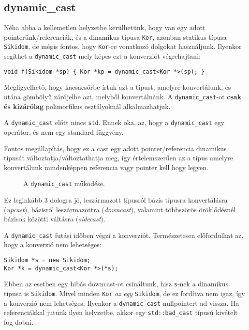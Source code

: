 \documentclass[../cpp_book/cpp_book.tex]{subfiles}
\begin{document}
	\subsection{dynamic\_cast}
	Néha abba a kellemetlen helyzetbe kerülhetünk, hogy van egy adott pointerünk/referenciák, és a dinamikus típusa \texttt{Kor}, azonban statikus típusa \texttt{Sikidom}, de mégis fontos, hogy \texttt{Kor}-re vonatkozó dolgokat használjunk. Ilyenkor segíthet a \texttt{dynamic\_cast} mely képes ezt a konverziót végrehajtani:
	\begin{lstlisting}
void f(Sikidom *sp) { Kor *kp = dynamic_cast<Kor *>(sp); }
	\end{lstlisting}
	Megfigyelhető, hogy kacsacsőrbe írtuk azt a típust, amelyre konvertálunk, és utána gömbölyű zárójelbe azt, melyből konvertálnánk. A \texttt{dynamic\_cast}-ot \textbf{csak és kizárólag} polimorfikus osztályoknál alkalmazhatjuk.
	\begin{note}
		A \texttt{dynamic\_cast} előtt nincs \texttt{std}. Ennek oka, az, hogy a \texttt{dynamic\_cast} egy operátor, és nem egy standard függvény.
	\end{note}
	Fontos megállapítás, hogy ez a cast egy adott pointer/referencia dinamikus típusát változtatja/változtathatja meg, így értelemszerűen az a típus amelyre konvertálunk mindenképpen referencia vagy pointer kell hogy legyen.
	\begin{figure}[!h]
		\centering
		
		
		\caption{A \texttt{dynamic\_cast} működése.}\label{fig_dynamic_cast}
	\end{figure}
	Ez leginkább 3 dologra jó, leszármazott típusról bázis típusra konvertálásra (\textit{upcast}), bázisról leszármazottra (\textit{downcast}), valamint többszörös öröklődésnél bázisok közötti váltásra (\textit{sidecast}).
	
	A \texttt{dynamic\_cast} futási időben végzi a konverziót. Természetesen előfordulhat az, hogy a konverzió nem lehetséges:
	\begin{lstlisting}
Sikidom *s = new Sikidom;
Kor *k = dynamic_cast<Kor *>(*s);
	\end{lstlisting}
	Ebben az esetben egy hibás downcast-ot csináltunk, hisz \texttt{s}-nek a dinamikus típusa is \texttt{Sikidom}. Mivel minden \texttt{Kor} \textit{az egy} \texttt{Sikidom}, de ez fordítva nem igaz, így a konverzió nem lehetséges. Ilyenkor a \texttt{dynamic\_cast} nullpointert ad vissza. Ha referenciákkal jutunk ilyen helyzetbe, akkor egy \texttt{std::bad\_cast} típusú kivételt fog dobni.
	
\end{document}
